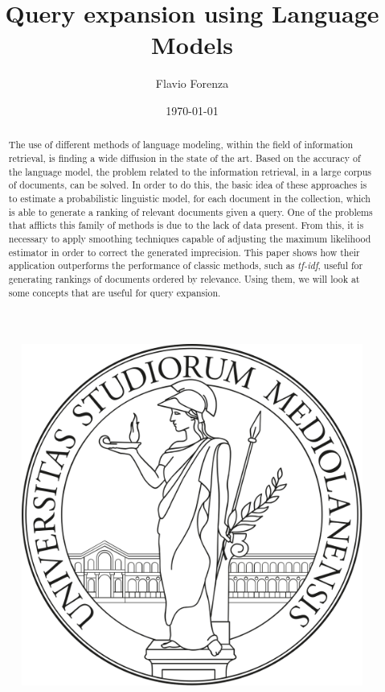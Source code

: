 \documentclass[letterpaper,12pt]{article}
\begin{document}
    
\title{\bfseries{Query expansion using Language Models}}
\author{Flavio Forenza}
\date\today
\maketitle

\begin{figure}[h!]
  \centering
  \includegraphics[width=0.2\linewidth]{images/logoUnimi2.png}
  \centering
\end{figure}

\begin{abstract}
  The use of different methods of language modeling, within the field 
  of information retrieval, is finding a wide diffusion in the state of the 
  art. Based on the accuracy of the language model, the problem related 
  to the information retrieval, in a large corpus of documents, can be 
  solved. In order to do this, the basic idea of these approaches is to 
  estimate a probabilistic linguistic model, for each document in the 
  collection, which is able to generate a ranking of relevant documents 
  given a query. One of the problems that afflicts this family of methods 
  is due to the lack of data present. From this, it is necessary to apply 
  smoothing techniques capable of adjusting the maximum likelihood 
  estimator in order to correct the generated imprecision. This paper 
  shows how their application outperforms the performance of classic 
  methods, such as \emph{tf-idf}, useful for generating rankings of 
  documents ordered by relevance. Using them, we will look at some concepts that 
  are useful for query expansion.
\end{abstract}

\newpage


\newpage




\newpage


\end{document}
